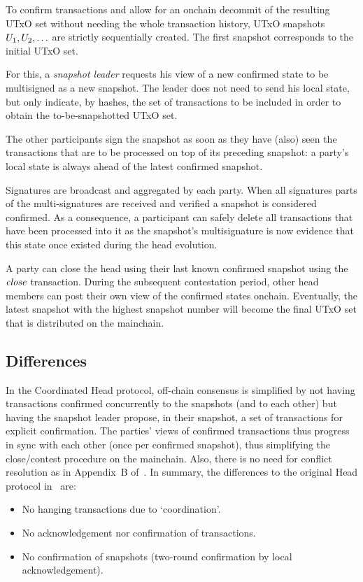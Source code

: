 To confirm transactions and allow for an onchain decommit of the resulting UTxO set
without needing the whole transaction history, UTxO snapshots $U_1,U_2,\ldots$ are
strictly sequentially created. The first snapshot corresponds to the initial UTxO set.

For this, a \emph{snapshot leader} requests his view of
a new confirmed state to be multisigned as a new snapshot. The leader does not need to send his local state,
but only indicate, by hashes, the set of transactions to be included in order to obtain the to-be-snapshotted UTxO set.

The other participants sign the snapshot as soon as they have (also) seen the
transactions that are to be processed on top of its preceding snapshot: a
party's local state is always ahead of the latest confirmed snapshot.

Signatures are broadcast and aggregated by each party. When all signatures parts of the
multi-signatures are received and verified a snapshot is considered confirmed.
As a consequence, a participant can safely delete all transactions that have been processed into it as the
snapshot's multisignature is now evidence that this state once existed during the head evolution.

A party can close the head using their last known confirmed snapshot using the $\textit{close}$ transaction.
During the subsequent contestation period, other head members can post their own view of the confirmed states onchain.
Eventually, the latest snapshot with the highest snapshot number will become the final UTxO set that is distributed on the mainchain.

\subsection{Differences}

In the Coordinated Head protocol, off-chain consensus is simplified by not having transactions
confirmed concurrently to the snapshots (and to each other) but having the snapshot leader propose,
in their snapshot, a set of transactions for explicit confirmation. The parties' views of confirmed
transactions thus progress in sync with each other (once per confirmed snapshot), thus simplifying
the close/contest procedure on the mainchain. Also, there is no need for conflict resolution as
in Appendix~B of~\cite{hydrahead20}. In summary, the differences to the original Head protocol in~\cite{hydrahead20} are:

\begin{itemize}
  \item No hanging transactions due to `coordination'.
  \item No acknowledgement nor confirmation of transactions.
  \item No confirmation of snapshots (two-round confirmation by local acknowledgement).
\end{itemize}

